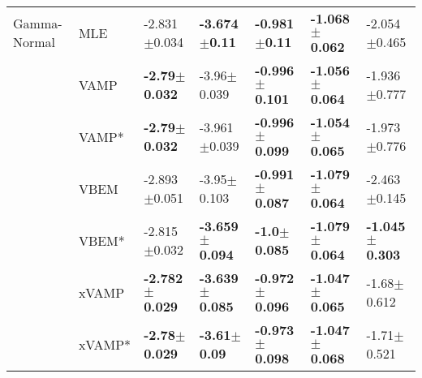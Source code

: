 \begin{tabular}{lllllll}
Gamma-Normal & MLE &           -2.831$\pm$0.034 &   \textbf{-3.674$\pm$0.11} &   \textbf{-0.981$\pm$0.11} &  \textbf{-1.068$\pm$0.062} &           -2.054$\pm$0.465 \\
             & VAMP &   \textbf{-2.79$\pm$0.032} &            -3.96$\pm$0.039 &  \textbf{-0.996$\pm$0.101} &  \textbf{-1.056$\pm$0.064} &           -1.936$\pm$0.777 \\
             & VAMP* &   \textbf{-2.79$\pm$0.032} &           -3.961$\pm$0.039 &  \textbf{-0.996$\pm$0.099} &  \textbf{-1.054$\pm$0.065} &           -1.973$\pm$0.776 \\
             & VBEM &           -2.893$\pm$0.051 &            -3.95$\pm$0.103 &  \textbf{-0.991$\pm$0.087} &  \textbf{-1.079$\pm$0.064} &           -2.463$\pm$0.145 \\
             & VBEM* &           -2.815$\pm$0.032 &  \textbf{-3.659$\pm$0.094} &    \textbf{-1.0$\pm$0.085} &  \textbf{-1.079$\pm$0.064} &  \textbf{-1.045$\pm$0.303} \\
             & xVAMP &  \textbf{-2.782$\pm$0.029} &  \textbf{-3.639$\pm$0.085} &  \textbf{-0.972$\pm$0.096} &  \textbf{-1.047$\pm$0.065} &            -1.68$\pm$0.612 \\
             & xVAMP* &   \textbf{-2.78$\pm$0.029} &    \textbf{-3.61$\pm$0.09} &  \textbf{-0.973$\pm$0.098} &  \textbf{-1.047$\pm$0.068} &            -1.71$\pm$0.521 \\
\bottomrule
\end{tabular}

